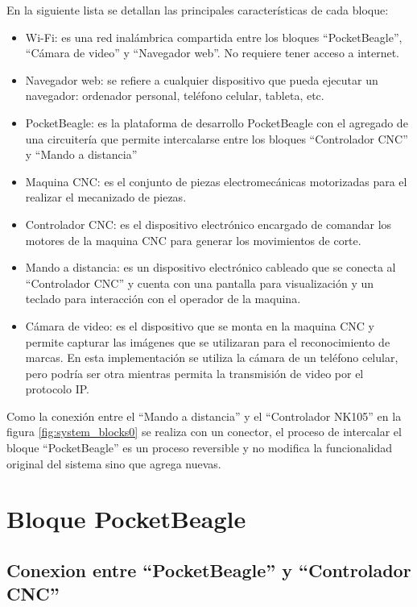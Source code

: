          En la siguiente lista se detallan las principales características de cada bloque:
         \begin{itemize}
            \item{Wi-Fi: es una red inalámbrica compartida entre los bloques ``PocketBeagle'', ``Cámara de video'' y ``Navegador web''. No requiere tener acceso a internet.}
            \item{Navegador web: se refiere a cualquier dispositivo que pueda ejecutar un navegador: ordenador personal, teléfono celular, tableta, etc.}
            \item{PocketBeagle: es la plataforma de desarrollo PocketBeagle con el agregado de una circuitería que permite intercalarse entre los bloques ``Controlador CNC'' y ``Mando a distancia''}
            \item{Maquina CNC: es el conjunto de piezas electromecánicas motorizadas para el realizar el mecanizado de piezas.}
            \item{Controlador CNC: es el dispositivo electrónico encargado de comandar los motores de la maquina CNC para generar los movimientos de corte.}
            \item{Mando a distancia: es un dispositivo electrónico cableado que se conecta al ``Controlador CNC'' y cuenta con una pantalla para visualización y un teclado para interacción con el operador de la maquina.}
            \item{Cámara de video: es el dispositivo que se monta en la maquina CNC y permite capturar las imágenes que se utilizaran para el reconocimiento de marcas. En esta implementación se utiliza la cámara de un teléfono celular, pero podría ser otra mientras permita la transmisión de video por el protocolo IP.}
         \end{itemize}

         Como la conexión entre el ``Mando a distancia'' y el ``Controlador NK105'' en la figura \ref{fig:system_blocks0} se realiza con un conector, el proceso de intercalar el bloque ``PocketBeagle'' es un proceso reversible y no modifica la funcionalidad original del sistema sino que agrega nuevas. \par


\section{Bloque PocketBeagle}
   \subsection{Conexion entre ``PocketBeagle'' y ``Controlador CNC''}

